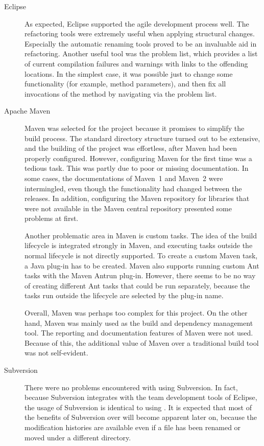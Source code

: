 \begin{description}
\item[Eclipse] As expected, Eclipse supported the agile development 
process well. The refactoring tools were extremely useful when 
applying structural changes. Especially the automatic renaming tools 
proved to be an invaluable aid in refactoring. Another useful tool was 
the problem list, which provides a list of current compilation 
failures and warnings with links to the offending locations. In the 
simplest case, it was possible just to change some functionality (for 
example, method parameters), and then fix all invocations of the 
method by navigating via the problem list.

\item[Apache Maven] Maven was selected for the project because it 
promises to simplify the build process. The standard directory 
structure turned out to be extensive, and the building of the project 
was effortless, after Maven had been properly configured. However, 
configuring Maven for the first time was a tedious task. This was 
partly due to poor or missing documentation. In some cases, the 
documentations of Maven~1 and Maven~2 were intermingled, even though 
the functionality had changed between the releases. In addition, 
configuring the Maven repository for libraries that were not available 
in the Maven central repository presented some problems at first.

Another problematic area in Maven is custom tasks. The idea of the 
build lifecycle is integrated strongly in Maven, and executing tasks 
outside the normal lifecycle is not directly supported. To create a 
custom Maven task, a Java plug-in has to be created. Maven also 
supports running custom Ant tasks with the Maven Antrun plug-in. 
However, there seems to be no way of creating different Ant tasks that 
could be run separately, because the tasks run outside the lifecycle 
are selected by the plug-in name.

Overall, Maven was perhaps too complex for this project. On the other 
hand, Maven was mainly used as the build and dependency management 
tool. The reporting and documentation features of Maven were not used. 
Because of this, the additional value of Maven over a traditional 
build tool was not self-evident.

\item[Subversion] There were no problems encountered with using 
Subversion. In fact, because Subversion integrates with the team 
development tools of Eclipse, the usage of Subversion is identical to 
using . It is expected that most of the benefits of 
Subversion over  will become apparent later on, because 
the modification histories are available even if a file has been 
renamed or moved under a different directory.


\end{description}
